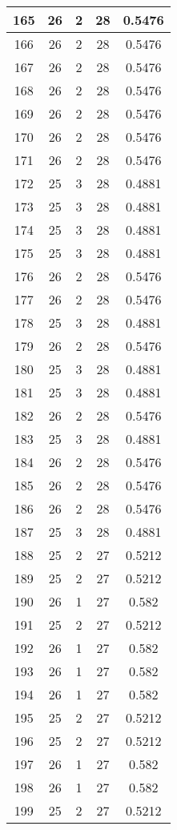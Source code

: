 \documentclass[letterpaper, 12pt]{article}
\begin{document}
\begin{longtable}{|c|c|c|c|c|}
\hline
165 & 26 & 2 & 28 & 0.5476 \\
\hline
166 & 26 & 2 & 28 & 0.5476 \\
\hline
167 & 26 & 2 & 28 & 0.5476 \\
\hline
168 & 26 & 2 & 28 & 0.5476 \\
\hline
169 & 26 & 2 & 28 & 0.5476 \\
\hline
170 & 26 & 2 & 28 & 0.5476 \\
\hline
171 & 26 & 2 & 28 & 0.5476 \\
\hline
172 & 25 & 3 & 28 & 0.4881 \\
\hline
173 & 25 & 3 & 28 & 0.4881 \\
\hline
174 & 25 & 3 & 28 & 0.4881 \\
\hline
175 & 25 & 3 & 28 & 0.4881 \\
\hline
176 & 26 & 2 & 28 & 0.5476 \\
\hline
177 & 26 & 2 & 28 & 0.5476 \\
\hline
178 & 25 & 3 & 28 & 0.4881 \\
\hline
179 & 26 & 2 & 28 & 0.5476 \\
\hline
180 & 25 & 3 & 28 & 0.4881 \\
\hline
181 & 25 & 3 & 28 & 0.4881 \\
\hline
182 & 26 & 2 & 28 & 0.5476 \\
\hline
183 & 25 & 3 & 28 & 0.4881 \\
\hline
184 & 26 & 2 & 28 & 0.5476 \\
\hline
185 & 26 & 2 & 28 & 0.5476 \\
\hline
186 & 26 & 2 & 28 & 0.5476 \\
\hline
187 & 25 & 3 & 28 & 0.4881 \\
\hline
188 & 25 & 2 & 27 & 0.5212 \\
\hline
189 & 25 & 2 & 27 & 0.5212 \\
\hline
190 & 26 & 1 & 27 & 0.582 \\
\hline
191 & 25 & 2 & 27 & 0.5212 \\
\hline
192 & 26 & 1 & 27 & 0.582 \\
\hline
193 & 26 & 1 & 27 & 0.582 \\
\hline
194 & 26 & 1 & 27 & 0.582 \\
\hline
195 & 25 & 2 & 27 & 0.5212 \\
\hline
196 & 25 & 2 & 27 & 0.5212 \\
\hline
197 & 26 & 1 & 27 & 0.582 \\
\hline
198 & 26 & 1 & 27 & 0.582 \\
\hline
199 & 25 & 2 & 27 & 0.5212 \\
\hline
\end{longtable}
\end{document}
